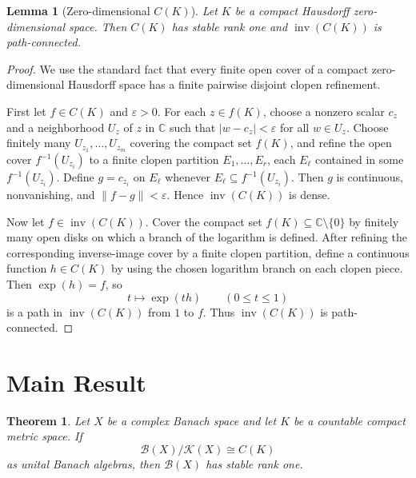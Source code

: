 \documentclass[11pt]{amsart}
\newtheorem{theorem}{Theorem}
\newtheorem{lemma}{Lemma}
\newcommand{\B}{\mathcal B}
\newcommand{\K}{\mathcal K}
\newcommand{\C}{\mathbb C}
\newcommand{\inv}{\operatorname{inv}}
\begin{document}
\begin{lemma}[Zero-dimensional \(C(K)\)]\label{lem:zero-dim}
Let \(K\) be a compact Hausdorff zero-dimensional space.  Then \(C(K)\) has
stable rank one and \(\inv(C(K))\) is path-connected.
\end{lemma}

\begin{proof}
We use the standard fact that every finite open cover of a compact
zero-dimensional Hausdorff space has a finite pairwise disjoint clopen
refinement.

First let \(f\in C(K)\) and \(\varepsilon>0\).  For each \(z\in f(K)\), choose
a nonzero scalar \(c_z\) and a neighborhood \(U_z\) of \(z\) in \(\C\) such
that \(|w-c_z|<\varepsilon\) for all \(w\in U_z\).  Choose finitely many
\(U_{z_1},\ldots,U_{z_m}\) covering the compact set \(f(K)\), and refine the
open cover \(f^{-1}(U_{z_i})\) to a finite clopen partition
\(E_1,\ldots,E_r\), each \(E_\ell\) contained in some \(f^{-1}(U_{z_i})\).
Define \(g=c_{z_i}\) on \(E_\ell\) whenever \(E_\ell\subseteq f^{-1}(U_{z_i})\).
Then \(g\) is continuous, nonvanishing, and \(\|f-g\|<\varepsilon\).  Hence
\(\inv(C(K))\) is dense.

Now let \(f\in\inv(C(K))\).  Cover the compact set \(f(K)\subseteq\C\setminus
\{0\}\) by finitely many open disks on which a branch of the logarithm is
defined.  After refining the corresponding inverse-image cover by a finite
clopen partition, define a continuous function \(h\in C(K)\) by using the
chosen logarithm branch on each clopen piece.  Then \(\exp(h)=f\), so
\[
        t\mapsto \exp(th)\qquad (0\leq t\leq 1)
\]
is a path in \(\inv(C(K))\) from \(1\) to \(f\).  Thus \(\inv(C(K))\) is
path-connected.
\end{proof}

\section{Main Result}

\begin{theorem}\label{thm:main}
Let \(X\) be a complex Banach space and let \(K\) be a countable compact metric
space.  If
\[
        \B(X)/\K(X)\cong C(K)
\]
as unital Banach algebras, then \(\B(X)\) has stable rank one.
\end{theorem}
\end{document}
